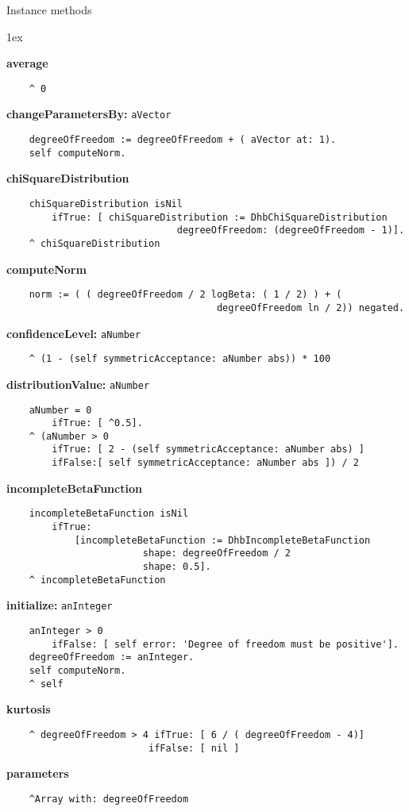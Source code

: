 Instance methods
{\parskip 1ex\par\noindent}
{\bf average}
\begin{verbatim}
    ^ 0
\end{verbatim}
{\bf changeParametersBy:} {\tt aVector}
\begin{verbatim}
    degreeOfFreedom := degreeOfFreedom + ( aVector at: 1).
    self computeNorm.
\end{verbatim}
{\bf chiSquareDistribution}
\begin{verbatim}
    chiSquareDistribution isNil
        ifTrue: [ chiSquareDistribution := DhbChiSquareDistribution 
                              degreeOfFreedom: (degreeOfFreedom - 1)].
    ^ chiSquareDistribution
\end{verbatim}
{\bf computeNorm}
\begin{verbatim}
    norm := ( ( degreeOfFreedom / 2 logBeta: ( 1 / 2) ) + ( 
                                     degreeOfFreedom ln / 2)) negated.
\end{verbatim}
{\bf confidenceLevel:} {\tt aNumber}
\begin{verbatim}
    ^ (1 - (self symmetricAcceptance: aNumber abs)) * 100
\end{verbatim}
{\bf distributionValue:} {\tt aNumber}
\begin{verbatim}
    aNumber = 0
        ifTrue: [ ^0.5].
    ^ (aNumber > 0
        ifTrue: [ 2 - (self symmetricAcceptance: aNumber abs) ]
        ifFalse:[ self symmetricAcceptance: aNumber abs ]) / 2

\end{verbatim}
{\bf incompleteBetaFunction}
\begin{verbatim}
    incompleteBetaFunction isNil 
        ifTrue: 
            [incompleteBetaFunction := DhbIncompleteBetaFunction 
                        shape: degreeOfFreedom / 2
                        shape: 0.5].
    ^ incompleteBetaFunction
\end{verbatim}
{\bf initialize:} {\tt anInteger}
\begin{verbatim}
    anInteger > 0
        ifFalse: [ self error: 'Degree of freedom must be positive'].
    degreeOfFreedom := anInteger.
    self computeNorm.
    ^ self
\end{verbatim}
{\bf kurtosis}
\begin{verbatim}
    ^ degreeOfFreedom > 4 ifTrue: [ 6 / ( degreeOfFreedom - 4)]
                         ifFalse: [ nil ]
\end{verbatim}
{\bf parameters}
\begin{verbatim}
    ^Array with: degreeOfFreedom
\end{verbatim}
